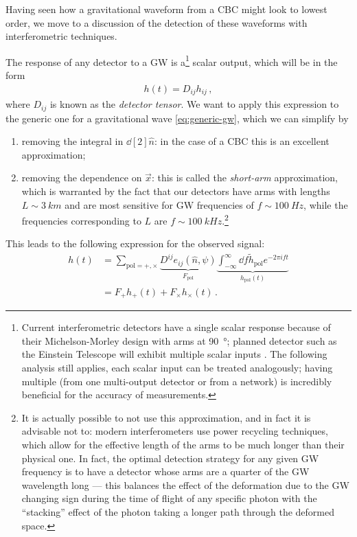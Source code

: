 \documentclass[main.tex]{subfiles}
\begin{document}
Having seen how a gravitational waveform from a \ac{CBC} might look to lowest order, we move to a discussion of the detection of these waveforms with interferometric techniques. 

The response of any detector to a \ac{GW} is a\footnote{Current interferometric detectors have a single scalar response because of their Michelson-Morley design with arms at \SI{90}{\degree}; planned detector such as the Einstein Telescope will exhibit multiple scalar inputs \cite[section 5.3.2]{etscienceteamEinsteinGravitationalWave2011}. The following analysis still applies, each scalar input can be treated analogously; having multiple (from one multi-output detector or from a network) is incredibly beneficial for the accuracy of measurements.} scalar output, which will be in the form 
%
\begin{align}
h(t) = D_{ij} h_{ij}
\,,
\end{align}
%
where \(D_{ij}\) is known as the \emph{detector tensor}. 
We want to apply this expression to the generic one for a gravitational wave \eqref{eq:generic-gw}, which we can simplify by
\begin{enumerate}
    \item removing the integral in \(\dd[2]{\hat{n}}\): in the case of a \ac{CBC} this is an excellent approximation;
    \item removing the dependence on \(\vec{x}\): this is called the \emph{short-arm} approximation, which is warranted by the fact that our detectors have arms with lengths \(L \sim \SI{3}{km}\) and are most sensitive for \ac{GW} frequencies of \(f \sim \SI{100}{Hz}\), while the frequencies corresponding to \(L\) are \(f \sim
     \SI{100}{kHz}\).\footnote{It is actually possible to not use this approximation, and in fact it is advisable not to: modern interferometers use power recycling techniques, which allow for the effective length of the arms to be much longer than their physical one. In fact, the optimal detection strategy for any given \ac{GW} frequency is to have a detector whose arms are a quarter of the \ac{GW} wavelength long \cite[eq.\ 9.33]{maggioreGravitationalWavesVolume2007} --- this balances the effect of the deformation due to the \ac{GW} changing sign during the time of flight of any specific photon with the ``stacking'' effect of the photon taking a longer path through the deformed space.}
\end{enumerate}

This leads to the following expression for the observed signal:
%
\begin{align}
h(t) &= \sum _{\text{pol}= +, \times } \underbrace{D^{ij} e_{ij}(\hat{n}, \psi )}_{F _{\text{pol}}}  \underbrace{\int_{- \infty }^{\infty } \dd{f} \widetilde{h} _{\text{pol}} e^{-2 \pi i f t}}_{h _{\text{pol}}(t)}  \\
&= F_+ h_+ (t) + F_\times h_\times (t)
\,.
\end{align}
\end{document}
